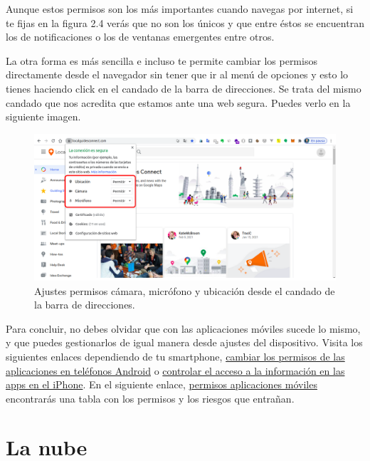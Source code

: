 \documentclass[
  spanish,
  a4paper,
  openany]{book}
\begin{document}
Aunque estos permisos son los más importantes cuando navegas por internet, si te fijas en la figura 2.4 verás que no son los únicos y que entre éstos se encuentran los de notificaciones o los de ventanas emergentes entre otros.

La otra forma es más sencilla e incluso te permite cambiar los permisos directamente desde el navegador sin tener que ir al menú de opciones y esto lo tienes haciendo click en el candado de la barra de direcciones. Se trata del mismo candado que nos acredita que estamos ante una web segura. Puedes verlo en la siguiente imagen.

\begin{figure}

{\centering \includegraphics[width=0.75\linewidth]{images/ajuste-permisos-desde-navegador} 

}

\caption{Ajustes permisos cámara, micrófono y ubicación desde el candado de la barra de direcciones.}\label{fig:unnamed-chunk-8}
\end{figure}

Para concluir, no debes olvidar que con las aplicaciones móviles sucede lo mismo, y que puedes gestionarlos de igual manera desde ajustes del dispositivo. Visita los siguientes enlaces dependiendo de tu smartphone, \href{https://support.google.com/android/answer/9431959?hl=es}{cambiar los permisos de las aplicaciones en teléfonos Android} o \href{https://support.apple.com/es-es/guide/iphone/iph251e92810/ios}{controlar el acceso a la información en las apps en el iPhone}. En el siguiente enlace, \href{https://www.osi.es/sites/default/files/docs/c5-eg-permisos-apps-riesgos.pdf}{permisos aplicaciones móviles} encontrarás una tabla con los permisos y los riesgos que entrañan.

\hypertarget{la-nube}{%
\section{La nube}\label{la-nube}}
\end{document}
